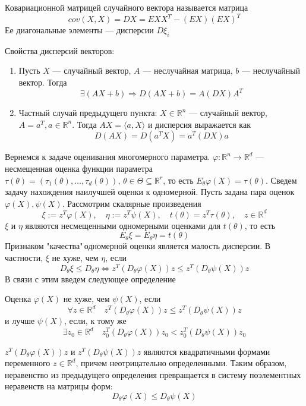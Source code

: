 \documentclass[12pt, russian]{article}
\begin{document}
\begin{mydef}
Ковариационной матрицей случайного вектора называется матрица 
$$ cov(X, X) = DX = EXX^T - (EX)(EX)^T $$
Ее диагональные элементы --- дисперсии $D\xi_i$
\end{mydef}

Свойства дисперсий векторов:
\begin{enumerate}
\item Пусть $X$ --- случайный вектор, $A$ --- неслучайная матрица, $b$ --- неслучайный вектор. Тогда
$$ \exists(AX + b) \Longrightarrow D(AX + b) = A(DX)A^T$$
\item Частный случай предыдущего пункта: $X\in\mathbb{R}^n$ --- случайный вектор, $A=a^T, a\in\mathbb{R}^n$. Тогда $AX = \langle a, X\rangle$ и дисперсия выражается как
$$ D(AX) = D(a^TX) = a^T(DX)a $$
\end{enumerate}

\noindent Вернемся к задаче оценивания многомерного параметра. $\varphi:\mathbb{R}^n \rightarrow \mathbb{R}^d$ --- несмещенная оценка функции параметра $\tau(\theta) = (\tau_1(\theta),\ldots,\tau_d(\theta)),\,\theta\in\Theta\subseteq\mathbb{R}^r$, то есть $E_\theta\varphi(X) = \tau(\theta)$. Сведем задачу нахождения наилучшей оценки к одномерной. Пусть задана пара оценок $\varphi(X), \psi(X)$. Рассмотрим скалярные произведения
$$ \xi := z^T\varphi(X),\quad \eta := z^T\psi(X),\quad t(\theta) = z^T\tau(\theta),\quad z\in\mathbb{R}^d$$
$\xi$ и $\eta$ являются несмещенными одномерными оценками для $t(\theta)$, то есть
$$ E_\theta\xi = E_\theta\eta = t(\theta) $$
Признаком "качества"\,одномерной оценки является малость дисперсии. В частности, $\xi$ не хуже, чем $\eta$, если
$$ D_\theta\xi \leq D_\theta\eta \Longleftrightarrow z^T(D_\theta\varphi(X))z \leq z^T(D_\theta\psi(X))z $$
В связи с этим введем следующее определение
\begin{mydef}
Оценка $\varphi(X)$ не хуже, чем $\psi(X)$, если
$$ \forall z\in\mathbb{R}^d\quad z^T(D_\theta\varphi(X))z \leq z^T(D_\theta\psi(X))z $$
и лучше $\psi(X)$, если, к тому же
$$ \exists z_0\in\mathbb{R}^d\quad z_0^T(D_\theta\varphi(X))z_0 < z_0^T(D_\theta\psi(X))z_0 $$
\end{mydef}

$z^T(D_\theta\varphi(X))z$ и $z^T(D_\theta\psi(X))z$ являются квадратичными формами переменного $z\in\mathbb{R}^d$, причем неотрицательно определенными. Таким образом, неравенство из предыдущего определения превращается в систему поэлементных неравенств на матрицы форм:
$$ D_\theta\varphi(X) \leq D_\theta\psi(X) $$ 
\end{document}
